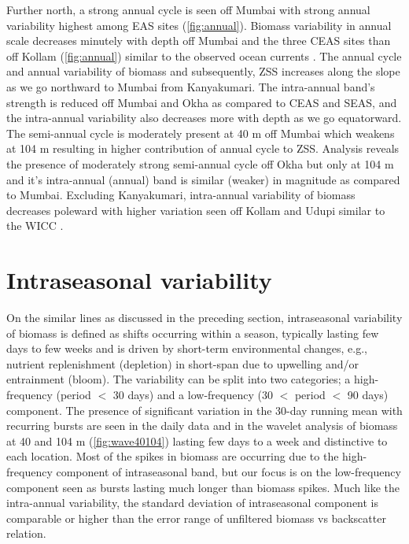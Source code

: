 \documentclass{article}
\begin{document}
    Further north, a strong annual cycle is seen off Mumbai with strong annual variability highest among EAS sites (\cref{fig:annual}). Biomass variability in annual scale decreases minutely with depth off Mumbai and the three CEAS sites than off Kollam (\cref{fig:annual}) similar to the observed ocean currents \citep{chaudhuri2020observed,chaudhuri2021observed}. The annual cycle and annual variability of biomass and subsequently, ZSS increases along the slope as we go northward to Mumbai from Kanyakumari. The intra-annual band's strength is reduced off Mumbai and Okha as compared to CEAS and SEAS, and the intra-annual variability also decreases more with depth as we go equatorward. The semi-annual cycle is moderately present at 40 m off Mumbai which weakens at 104 m resulting in higher contribution of annual cycle to ZSS. Analysis reveals the presence of moderately strong semi-annual cycle off Okha but only at 104 m and it's intra-annual (annual) band is similar (weaker) in magnitude as compared to Mumbai. Excluding Kanyakumari, intra-annual variability of biomass decreases  poleward with higher variation seen off Kollam and Udupi similar to the WICC \citep{amol2014observed,chaudhuri2020observed}.	

	
	\section{Intraseasonal variability}
	\label{sec:intsnvar}
	On the similar lines as discussed in the preceding section, intraseasonal variability of biomass is defined as shifts occurring within a season, typically lasting few days to few weeks and is driven by short-term environmental changes, e.g., nutrient  replenishment (depletion) in short-span due to upwelling and/or entrainment (bloom). The variability can be split into two categories; a high-frequency (period $<$ 30 days) and a low-frequency (30 $<$ period $<$ 90 days) component. The presence of significant variation in the 30-day running mean with recurring bursts are seen in the daily data and in the  wavelet analysis of biomass at 40 and 104 m (\cref{fig:wave40104}) lasting few days to a week and distinctive to each location. Most of the spikes in biomass are occurring due to the high-frequency component of intraseasonal band, but our focus is on the low-frequency component seen as bursts lasting much longer than biomass spikes. Much like the intra-annual variability, the standard deviation of intraseasonal component is comparable or higher than the error range of unfiltered biomass vs backscatter relation.
	
\end{document}
